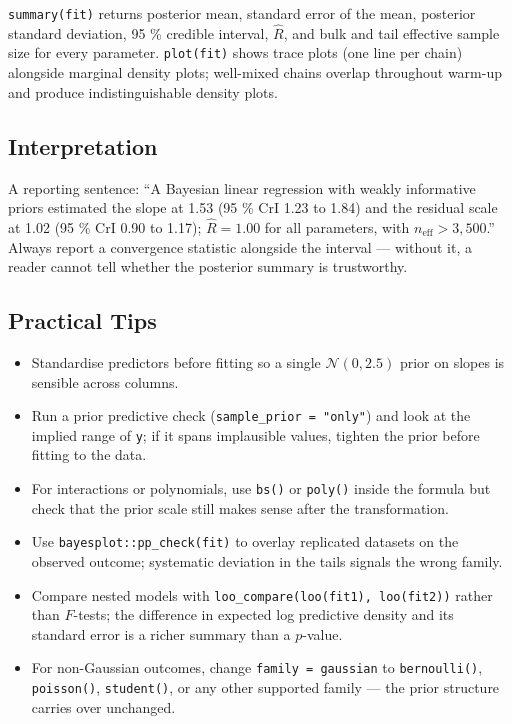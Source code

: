 \documentclass[
]{article}
\providecommand{\tightlist}{%
  \setlength{\itemsep}{0pt}\setlength{\parskip}{0pt}}
\begin{document}
\texttt{summary(fit)} returns posterior mean, standard error of the
mean, posterior standard deviation, 95 \% credible interval, \(\hat R\),
and bulk and tail effective sample size for every parameter.
\texttt{plot(fit)} shows trace plots (one line per chain) alongside
marginal density plots; well-mixed chains overlap throughout warm-up and
produce indistinguishable density plots.

\subsection{Interpretation}\label{interpretation}

A reporting sentence: ``A Bayesian linear regression with weakly
informative priors estimated the slope at 1.53 (95 \% CrI 1.23 to 1.84)
and the residual scale at 1.02 (95 \% CrI 0.90 to 1.17);
\(\hat R = 1.00\) for all parameters, with
\(n_{\text{eff}} > 3{,}500\).'' Always report a convergence statistic
alongside the interval --- without it, a reader cannot tell whether the
posterior summary is trustworthy.

\subsection{Practical Tips}\label{practical-tips}

\begin{itemize}
\tightlist
\item
  Standardise predictors before fitting so a single
  \(\mathcal N(0, 2.5)\) prior on slopes is sensible across columns.
\item
  Run a prior predictive check (\texttt{sample\_prior\ =\ "only"}) and
  look at the implied range of \texttt{y}; if it spans implausible
  values, tighten the prior before fitting to the data.
\item
  For interactions or polynomials, use \texttt{bs()} or \texttt{poly()}
  inside the formula but check that the prior scale still makes sense
  after the transformation.
\item
  Use \texttt{bayesplot::pp\_check(fit)} to overlay replicated datasets
  on the observed outcome; systematic deviation in the tails signals the
  wrong family.
\item
  Compare nested models with
  \texttt{loo\_compare(loo(fit1),\ loo(fit2))} rather than \(F\)-tests;
  the difference in expected log predictive density and its standard
  error is a richer summary than a \(p\)-value.
\item
  For non-Gaussian outcomes, change \texttt{family\ =\ gaussian} to
  \texttt{bernoulli()}, \texttt{poisson()}, \texttt{student()}, or any
  other supported family --- the prior structure carries over unchanged.
\end{itemize}
\end{document}
